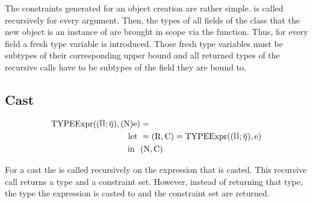 The constraints generated for an object creation are rather simple.  is called recursively for every argument. Then, the types of all
fields of the class that the new object is an instance of are brought in scope via the  function. Thus, for every field a fresh type variable is introduced.
Those fresh type variables must be subtypes of their corresponding upper bound and all returned types of the recursive calls have to be subtypes of the field they are bound to.

\subsection{Cast}

\begin{align*}
    \texpr{(\text{N})\text{e}} &=\\
    \text{let} \ &= (\text{R}, \text{C}) = \texpr{\text{e}}\\
    \text{in} \ \ &(\text{N}, \text{C})
\end{align*}

For a cast the  is called recursively on the expression that is casted. This recursive call returns a type and a constraint set. However, instead of returning that type, the type the expression is casted to and the constraint set are returned.
